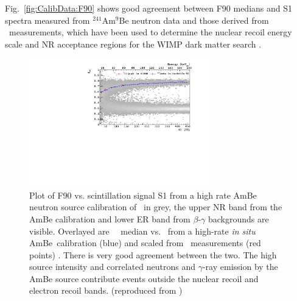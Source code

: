 Fig.~\ref{fig:CalibData:F90} shows good agreement between F90 medians and S1 spectra measured from $^{241}$Am$^9$Be neutron data and those derived from \SCENE\ measurements, which have been used to determine the nuclear recoil energy scale and NR acceptance regions for the WIMP dark matter search \cite{Agnes:2015gu, Agnes:2015_uar}.
\begin{figure}[htbp]
\centering
\includegraphics[width=0.7\textwidth]{./Figures/DSf-UArAmBeDMSStCut.pdf}
\caption{Plot of F90 vs. scintillation signal S1 from a high rate AmBe neutron source calibration of \dsf\ in grey, the upper NR band from the AmBe calibration and lower ER band from $\beta$-$\gamma$ backgrounds are visible. Overlayed are \FNinety\ \NR\ median vs. \SOne\ from a high-rate {\it in situ} AmBe\ calibration (blue) and scaled from \SCENE\ measurements (red points) \cite{Cao:2015ks}. There is very good agreement between the two.  The high source intensity and correlated neutrons and $\gamma$-ray emission by the AmBe source contribute events outside the nuclear recoil and electron recoil bands. (reproduced from \cite{Agnes:2015_uar})\label{fig:CalibData:F90}\label{fig:DSf-UArAmBeDMS}} 
\end{figure}


